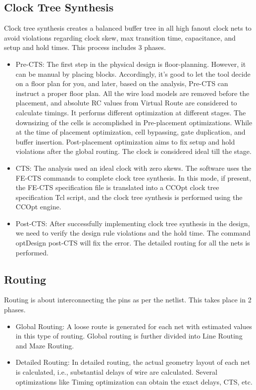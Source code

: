 \subsection{Clock Tree Synthesis}
Clock tree synthesis creates a balanced buffer tree in all high fanout clock nets to avoid violations regarding clock skew, max transition time, capacitance, and setup and hold times. This process includes 3 phases.
\begin{itemize}
\item Pre-CTS: The first step in the physical design is floor-planning. However, it can be manual by placing blocks. Accordingly, it's good to let the tool decide on a floor plan for you, and later, based on the analysis, Pre-CTS can instruct a proper floor plan. All the wire load models are removed before the placement, and absolute RC values from Virtual Route are considered to calculate timings. It performs different optimization at different stages. The downsizing of the cells is accomplished in Pre-placement optimizations. While at the time of placement optimization, cell bypassing, gate duplication, and buffer insertion. Post-placement optimization aims to fix setup and hold violations after the global routing. The clock is considered ideal till the stage.
\item CTS: The analysis used an ideal clock with zero skews. The software uses the FE-CTS commands to complete clock tree synthesis. In this mode, if present, the FE-CTS specification file is translated into a CCOpt clock tree specification Tcl script, and the clock tree synthesis is performed using the CCOpt engine.
\item Post-CTS: After successfully implementing clock tree synthesis in the design, we need to verify the design rule violations and the hold time. The command optDesign post-CTS will fix the error. The detailed routing for all the nets is performed.
\end{itemize}
\subsection{Routing}
Routing is about interconnecting the pins as per the netlist. This takes place in 2 phases.
\begin{itemize}
\item Global Routing: A loose route is generated for each net with estimated values in this type of routing. Global routing is further divided into Line Routing and Maze Routing.
\item Detailed Routing: In detailed routing, the actual geometry layout of each net is calculated, i.e., substantial delays of wire are calculated. Several optimizations like Timing optimization can obtain the exact delays, CTS, etc.
\end{itemize}

